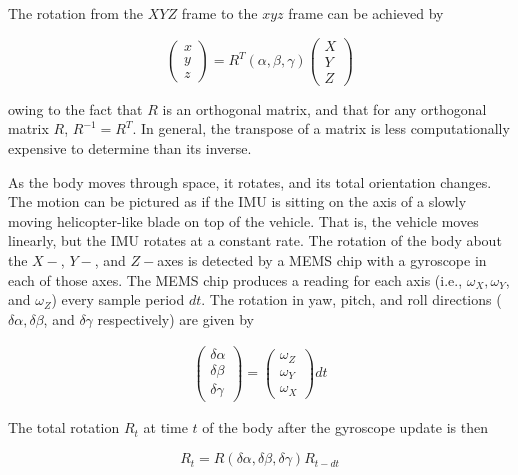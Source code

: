 \documentclass[10pt]{article}
\begin{document}
The rotation from the $XYZ$ frame to the $xyz$ frame can be achieved by

\begin{equation}
\begin{pmatrix}
x \\ y \\ z
\end{pmatrix}
=
R^T(\alpha, \beta, \gamma)
\begin{pmatrix}
X \\ Y \\ Z
\end{pmatrix}
\end{equation}

owing to the fact that $R$ is an orthogonal matrix, and that for any orthogonal matrix $R$, $R^{-1} = R^T$. In general, the transpose of a matrix is less computationally expensive to determine than its inverse.

As the body moves through space, it rotates, and its total orientation changes. The motion can be pictured as if the IMU is sitting on the axis of a slowly moving helicopter-like blade on top of the vehicle. That is, the vehicle moves linearly, but the IMU rotates at a constant rate. The rotation of the body about the $X-$, $Y-$, and $Z-$axes is detected by a MEMS chip with a gyroscope in each of those axes. The MEMS chip produces a reading for each axis (i.e., $\omega_X, \omega_Y$, and $\omega_Z$) every sample period $dt$. The rotation in yaw, pitch, and roll directions ($\delta\alpha, \delta\beta$, and $\delta\gamma$ respectively) are given by

\begin{align}
\begin{pmatrix}
\delta \alpha \\
\delta \beta \\
\delta \gamma 
\end{pmatrix}
=
\begin{pmatrix}
  \omega_Z \\
  \omega_Y \\
  \omega_X
\end{pmatrix}
dt
\end{align}

The total rotation $R_t$ at time $t$ of the body after the gyroscope update is then 

\begin{equation}
R_t = R(\delta \alpha, \delta\beta, \delta\gamma) R_{t-dt}
\end{equation}
\end{document}
